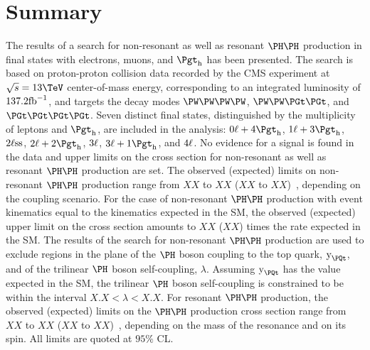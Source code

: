 \section{Summary}
\label{sec:summary}

The results of a search for non-resonant as well as resonant $\HH$ production in final states with electrons, muons, and $\tauh$ has been presented.
The search is based on proton-proton collision data recorded by the CMS experiment at $\sqrt{s} = 13\TeV$ center-of-mass energy,
corresponding to an integrated luminosity of $137.2\text{fb}^{-1}$,
and targets the decay modes $\PW\PW\PW\PW$, $\PW\PW\PGt\PGt$, and $\PGt\PGt\PGt\PGt$.
Seven distinct final states, distinguished by the multiplicity of leptons and $\tauh$, are included in the analysis:
$0\Plepton + 4\tauh$, $1\Plepton + 3\tauh$, $2\ell\text{ss}$, $2\Plepton + 2\tauh$, $3\ell$, $3\Plepton + 1\tauh$, and $4\ell$.
No evidence for a signal is found in the data and upper limits on the cross section for non-resonant as well as resonant $\HH$ production are set.
The observed (expected) limits on non-resonant $\HH$ production range from $XX$ to $XX$ ($XX$ to $XX$)~\pb, depending on the coupling scenario.
For the case of non-resonant $\HH$ production with event kinematics equal to the kinematics expected in the SM,
the observed (expected) upper limit on the cross section amounts to $XX$ ($XX$) times the rate expected in the SM.
The results of the search for non-resonant $\HH$ production are used to exclude regions in the plane of the $\PHiggs$ boson coupling to the top quark, $\yt$,
and of the trilinear $\PHiggs$ boson self-coupling, $\lambda$.
Assuming $\yt$ has the value expected in the SM, the trilinear $\PHiggs$ boson self-coupling is constrained to be within the interval $X.X < \lambda < X.X$.
For resonant $\HH$ production, the observed (expected) limits on the $\HH$ production cross section range from $XX$ to $XX$ ($XX$ to $XX$)~\pb, 
depending on the mass of the resonance and on its spin.
All limits are quoted at $95\%$ CL.
